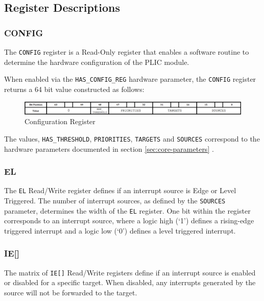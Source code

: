 \subsection{Register Descriptions}

\subsubsection{CONFIG}

The \texttt{CONFIG} register is a Read-Only register that enables a
software routine to determine the hardware configuration of the PLIC
module.

When enabled via the \texttt{HAS\_CONFIG\_REG} hardware parameter, the
\texttt{CONFIG} register returns a 64 bit value constructed as follows:

\begin{figure}[h] 
	\includegraphics[width=\linewidth]{assets/img/CONFIG} 
	\caption[Configuration Register]{Configuration Register}
	\label{fig:configreg}
\end{figure}



The values, \texttt{HAS\_THRESHOLD}, \texttt{PRIORITIES},
\texttt{TARGETS} and \texttt{SOURCES} correspond to the hardware
parameters documented in section \ref{sec:core-parameters} .

\subsubsection{EL}

The \texttt{EL} Read/Write register defines if an interrupt source is Edge or Level Triggered. The number of interrupt sources, as defined by the
\texttt{SOURCES} parameter, determines the width of the \texttt{EL} register. 
One bit within the register corresponds to an interrupt source, where a 
logic high (`1') defines a rising-edge triggered interrupt and a logic 
low (`0') defines a level triggered interrupt.

\subsubsection{IE[]}

The matrix of \texttt{IE[]} Read/Write registers define if an interrupt source is enabled or disabled for a specific target.
When disabled, any interrupts generated by the source will not be forwarded to the target.

